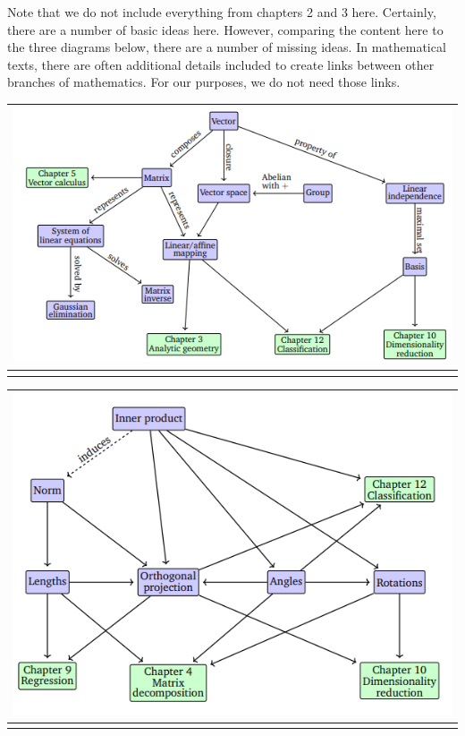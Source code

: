 \documentclass[
]{book}
\theoremstyle{definition}
\theoremstyle{definition}
\theoremstyle{definition}
\theoremstyle{definition}
\theoremstyle{remark}
\begin{document}
Note that we do not include everything from chapters 2 and 3 here. Certainly, there are a number of basic ideas here. However, comparing the content here to the three diagrams below, there are a number of missing ideas. In mathematical texts, there are often additional details included to create links between other branches of mathematics. For our purposes, we do not need those links.

\begin{longtable}[]{@{}c@{}}
\toprule\noalign{}
\includegraphics{MML4.png} \\
\midrule\noalign{}
\endhead
\bottomrule\noalign{}
\endlastfoot
\end{longtable}

\begin{longtable}[]{@{}c@{}}
\toprule\noalign{}
\includegraphics{MML2.png} \\
\midrule\noalign{}
\endhead
\bottomrule\noalign{}
\endlastfoot
\end{longtable}
\end{document}
